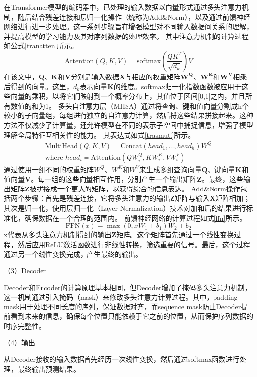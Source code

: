 在Transformer模型的编码器中，已处理的输入数据以向量形式通过多头注意力机制，随后结合残差连接和层归一化操作（统称为Add\&Norm），以及通过前馈神经网络进行进一步处理。这一系列步骤旨在增强模型对不同输入数据间关系的理解，并提高模型的学习能力及其对序列数据的处理效率。
其中注意力机制的计算过程如公式\eqref{tranatten}所示。
\begin{equation}
    \text{Attention}(Q,K,V) = \text{softmax}\left(\frac{QK^T}{\sqrt{d_k}}\right)V
    \label{tranatten}
\end{equation}
在该文中，\(\mathbf{Q}\)、\(\mathbf{K}\)和\(\mathbf{V}\)分别是输入数据\(\mathbf{X}\)与相应的权重矩阵\(\mathbf{W^Q}\)、\(\mathbf{W^K}\)和\(\mathbf{W^V}\)相乘后得到的向量。这里，\(d_k\)表示向量\(\mathbf{K}\)的维度。softmax归一化指数函数被应用于这些向量的乘积，以将它们映射到一个概率分布上，其值位于区间[0,1]之内，并且所有数值的和为1。
多头自注意力层（MHSA）通过将查询、键和值向量分割成h个较小的子向量组，每组进行独立的自注意力计算，然后将这些结果拼接起来。这种方法不仅减少了计算量，还允许模型在不同的表示子空间中捕捉信息，增强了模型理解全局特征互相关性的能力。
其表达式如式\eqref{trasmuti}所示。
\begin{equation}
    \begin{aligned}
        \text{MultiHead}(Q, K, V) = \text{Concat}(head_1, \ldots, head_h)W^Q \\
        \text{where } head_i = \text{Attention}(QW_i^Q, KW_i^K, VW_i^V)
        \label{trasmuti}
    \end{aligned}
\end{equation}
通过使用一组不同的权重矩阵\(W^Q\)、\(W^K\)和\(W^V\)来生成多组查询向量\(\mathbf{Q}\)、键向量\(\mathbf{K}\)和值向量\(\mathbf{V}\)。每一组的这些向量相互作用，分别产生一个输出矩阵\(\mathbf{Z}\)。最终，这些输出矩阵\(\mathbf{Z}\)被拼接成一个更大的矩阵，以获得综合的信息表达。   
Add\&Norm操作包括两个步骤：首先是残差连接，它将多头注意力的输出\(\mathbf{Z}\)矩阵与输入\(\mathbf{X}\)矩阵相加；其次是归一化，使用层归一化（Layer Normalization）技术对加和后的结果进行标准化，确保数据在一个合理的范围内。
前馈神经网络的计算过程如式\eqref{ffn}所示。
\begin{equation}
    \text{FFN}(x) = \max(0, xW_1 + b_1)W_2 + b_2
    \label{ffn}
\end{equation}
x代表从多头注意力机制得到的输出\(\mathbf{Z}\)矩阵。这个矩阵首先通过一个线性变换过程，然后应用ReLU激活函数进行非线性转换，筛选重要的信号。最后，这个过程通过另一个线性变换完成，产生最终的输出。

（3）Decoder 

Decoder和Encoder的计算原理基本相同，但Decoder增加了掩码多头注意力机制，这一机制通过引入掩码（mask）来修改多头注意力计算过程。其中，padding mask用于处理不同长度的序列，保证数据对齐，而sequence mask防止Decoder提前看到未来的信息，确保每个位置只能依赖于它之前的位置，从而保护序列数据的时序完整性。

（4）输出

从Decoder接收的输入数据首先经历一次线性变换，然后通过softmax函数进行处理，最终输出预测结果。